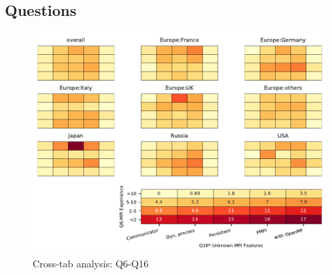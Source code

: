
\subsection{Questions}


\begin{figure}
\begin{center}
\includegraphics[width=12cm]{../pdfs/Q6-Q16.pdf}
\caption{Cross-tab analysis: Q6-Q16}
\label{fig:Q6-Q16}
\end{center}
\end{figure}

